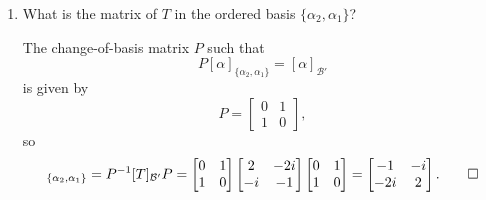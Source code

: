 \begin{enumerate}
\item What is the matrix of $T$ in the ordered basis
  $\{\alpha_2, \alpha_1\}$?
  \begin{solution}
    The change-of-basis matrix $P$ such that
    \begin{equation*}
      P[\alpha]_{\{\alpha_2,\alpha_1\}} = [\alpha]_{\mathcal{B}'}
    \end{equation*}
    is given by
    \begin{equation*}
      P =
      \begin{bmatrix}
        0 & 1 \\
        1 & 0
      \end{bmatrix},
    \end{equation*}
    so
    \begin{equation*}
      [T]_{\{\alpha_2,\alpha_1\}}
      = P^{-1}[T]_{\mathcal{B}'}P
      =
      \begin{bmatrix}
        0 & 1 \\
        1 & 0
      \end{bmatrix}
      \begin{bmatrix}
        2 & -2i \\
        -i & -1
      \end{bmatrix}
      \begin{bmatrix}
        0 & 1 \\
        1 & 0
      \end{bmatrix}
      =
      \begin{bmatrix}
        -1 & -i \\
        -2i & 2
      \end{bmatrix}. \qedhere
    \end{equation*}
  \end{solution}
\end{enumerate}

